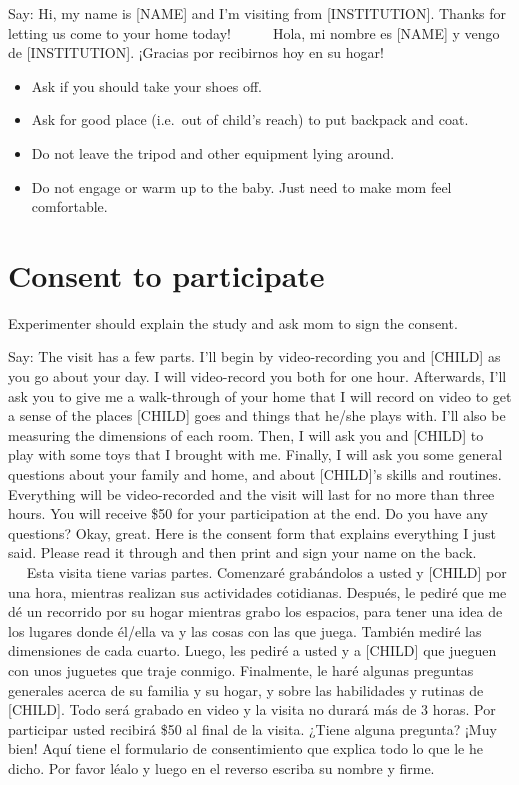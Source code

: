 \documentclass[
]{book}
\providecommand{\tightlist}{%
  \setlength{\itemsep}{0pt}\setlength{\parskip}{0pt}}
\begin{document}
Say: Hi, my name is {[}NAME{]} and I'm visiting from {[}INSTITUTION{]}. Thanks for letting us come to your home today!
    Hola, mi nombre es {[}NAME{]} y vengo de {[}INSTITUTION{]}. ¡Gracias por recibirnos hoy en su hogar!

\begin{itemize}
\tightlist
\item
  Ask if you should take your shoes off.
\item
  Ask for good place (i.e.~out of child's reach) to put backpack and coat.
\item
  Do not leave the tripod and other equipment lying around.
\item
  Do not engage or warm up to the baby. Just need to make mom feel comfortable.
\end{itemize}

\hypertarget{consent-to-participate}{%
\section{Consent to participate}\label{consent-to-participate}}

Experimenter should explain the study and ask mom to sign the consent.

Say: The visit has a few parts. I'll begin by video-recording you and {[}CHILD{]} as you go about your day. I will video-record you both for one hour. Afterwards, I'll ask you to give me a walk-through of your home that I will record on video to get a sense of the places {[}CHILD{]} goes and things that he/she plays with. I'll also be measuring the dimensions of each room. Then, I will ask you and {[}CHILD{]} to play with some toys that I brought with me. Finally, I will ask you some general questions about your family and home, and about {[}CHILD{]}'s skills and routines. Everything will be video-recorded and the visit will last for no more than three hours. You will receive \$50 for your participation at the end. Do you have any questions? Okay, great. Here is the consent form that explains everything I just said. Please read it through and then print and sign your name on the back.
    Esta visita tiene varias partes. Comenzaré grabándolos a usted y {[}CHILD{]} por una hora, mientras realizan sus actividades cotidianas. Después, le pediré que me dé un recorrido por su hogar mientras grabo los espacios, para tener una idea de los lugares donde él/ella va y las cosas con las que juega. También mediré las dimensiones de cada cuarto. Luego, les pediré a usted y a {[}CHILD{]} que jueguen con unos juguetes que traje conmigo. Finalmente, le haré algunas preguntas generales acerca de su familia y su hogar, y sobre las habilidades y rutinas de {[}CHILD{]}. Todo será grabado en video y la visita no durará más de 3 horas. Por participar usted recibirá \$50 al final de la visita. ¿Tiene alguna pregunta? ¡Muy bien! Aquí tiene el formulario de consentimiento que explica todo lo que le he dicho. Por favor léalo y luego en el reverso escriba su nombre y firme.
\end{document}
